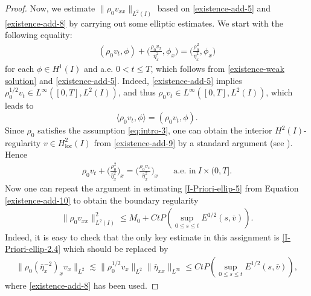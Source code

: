\documentclass[11pt, reqno]{amsart}
\numberwithin{equation}{section}
\begin{document}
{\begin{proof}
\bigskip
{} Now, we estimate \(\|\rho_0v_{xx}\|_{L^2(I)}\) based on \eqref{existence-add-5} and \eqref{existence-add-8} by carrying out some elliptic estimates.
We start with the following equality:  
\begin{equation}\label{existence-add-9}
	\begin{aligned}
(\rho_0v_t, \phi)+\bigg(\frac{\rho_0v_x}{\bar{\eta}_x^2}, \phi_x\bigg)=\bigg({\frac{\rho_0^2}{\bar{\eta}_x^2}}, \phi_x\bigg)
	\end{aligned}
\end{equation}
for each \(\phi\in H^1(I)\) and a.e. \(0< t\leq T\), which follows from \eqref{existence-weak solution} and \eqref{existence-add-5}. Indeed, \eqref{existence-add-5} implies \(\rho_0^{1/2}v_t\in L^\infty([0,T],L^2(I))\), and thus \(\rho_0v_t\in L^\infty([0,T],L^2(I))\), which leads to 
\[\langle\rho_0v_t, \phi\rangle=(\rho_0v_t, \phi).\]
Since \(\rho_0\) satisfies the assumption \eqref{eq:intro-3},  one can obtain the interior \(H^2(I)\)-regularity \(v\in H^2_{\text{loc}}(I)\) from \eqref{existence-add-9} by a standard argument (see \cite{MR2597943}). Hence 
\begin{equation}\label{existence-add-10}
	\begin{aligned}
		\rho_0v_t+\bigg({\frac{\rho_0^2}{\bar{\eta}_x^2}}\bigg)_x
		=\bigg(\frac{\rho_0v_x}{\bar{\eta}_x^2}\bigg)_x &\quad \mbox{a.e.\ in}\ I\times (0,T].
	\end{aligned}
\end{equation}
Now one can repeat the argument in estimating \eqref{I-Priori-ellip-5} from Equation \eqref{existence-add-10} to obtain the boundary regularity  
\begin{equation}\label{existence-add-12}
\begin{aligned}
\|\rho_0v_{xx}\|_{L^2(I)}^2\leq M_0+Ct P(\sup_{0\leq s\leq t}E^{1/2}(s,\bar{v})). 
\end{aligned}
\end{equation}
Indeed, it is easy to check that the only key estimate in this assignment is \eqref{I-Priori-ellip-2.4}{\color{red}{,}} which should be replaced by
\begin{equation*}
\begin{aligned}
\|\rho_0(\bar{\eta}_x^{-2})_{x}v_x\|_{L^2}
\lesssim \|\rho_0^{1/2}v_x\|_{L^2}\|\bar{\eta}_{xx}\|_{L^\infty}
\leq Ct P(\sup_{0\leq s\leq t}E^{1/2}(s,\bar{v})),
\end{aligned}
\end{equation*}
where \eqref{existence-add-8} has been used. 




\end{proof}}
\end{document}
